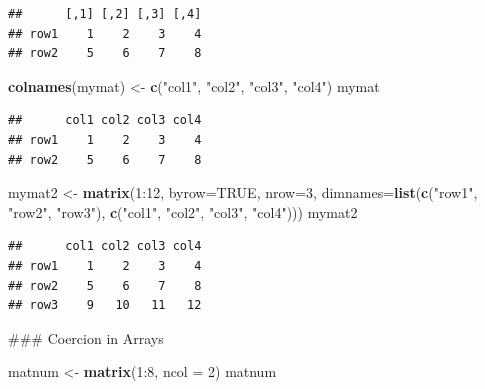 \documentclass[]{book}
\newenvironment{Shaded}{\begin{snugshade}}{\end{snugshade}}
\newcommand{\KeywordTok}[1]{\textcolor[rgb]{0.13,0.29,0.53}{\textbf{{#1}}}}
\newcommand{\DataTypeTok}[1]{\textcolor[rgb]{0.13,0.29,0.53}{{#1}}}
\newcommand{\DecValTok}[1]{\textcolor[rgb]{0.00,0.00,0.81}{{#1}}}
\newcommand{\StringTok}[1]{\textcolor[rgb]{0.31,0.60,0.02}{{#1}}}
\newcommand{\OtherTok}[1]{\textcolor[rgb]{0.56,0.35,0.01}{{#1}}}
\newcommand{\NormalTok}[1]{{#1}}
\begin{document}
\begin{verbatim}
##      [,1] [,2] [,3] [,4]
## row1    1    2    3    4
## row2    5    6    7    8
\end{verbatim}

\begin{Shaded}
\begin{Highlighting}[]
\KeywordTok{colnames}\NormalTok{(mymat) <-}\StringTok{ }\KeywordTok{c}\NormalTok{(}\StringTok{"col1"}\NormalTok{, }\StringTok{"col2"}\NormalTok{, }\StringTok{"col3"}\NormalTok{, }\StringTok{"col4"}\NormalTok{)}
\NormalTok{mymat}
\end{Highlighting}
\end{Shaded}

\begin{verbatim}
##      col1 col2 col3 col4
## row1    1    2    3    4
## row2    5    6    7    8
\end{verbatim}

\begin{Shaded}
\begin{Highlighting}[]
\NormalTok{mymat2 <-}\StringTok{ }\KeywordTok{matrix}\NormalTok{(}\DecValTok{1}\NormalTok{:}\DecValTok{12}\NormalTok{, }\DataTypeTok{byrow=}\OtherTok{TRUE}\NormalTok{, }\DataTypeTok{nrow=}\DecValTok{3}\NormalTok{, }\DataTypeTok{dimnames=}\KeywordTok{list}\NormalTok{(}\KeywordTok{c}\NormalTok{(}\StringTok{"row1"}\NormalTok{, }\StringTok{"row2"}\NormalTok{, }\StringTok{"row3"}\NormalTok{),}
                                                         \KeywordTok{c}\NormalTok{(}\StringTok{"col1"}\NormalTok{, }\StringTok{"col2"}\NormalTok{, }\StringTok{"col3"}\NormalTok{, }\StringTok{"col4"}\NormalTok{)))}
\NormalTok{mymat2}
\end{Highlighting}
\end{Shaded}

\begin{verbatim}
##      col1 col2 col3 col4
## row1    1    2    3    4
## row2    5    6    7    8
## row3    9   10   11   12
\end{verbatim}

\begin{Shaded}
\begin{Highlighting}[]
\NormalTok{### Coercion in Arrays}

\NormalTok{matnum <-}\StringTok{ }\KeywordTok{matrix}\NormalTok{(}\DecValTok{1}\NormalTok{:}\DecValTok{8}\NormalTok{, }\DataTypeTok{ncol =} \DecValTok{2}\NormalTok{)}
\NormalTok{matnum}
\end{Highlighting}
\end{Shaded}
\end{document}
